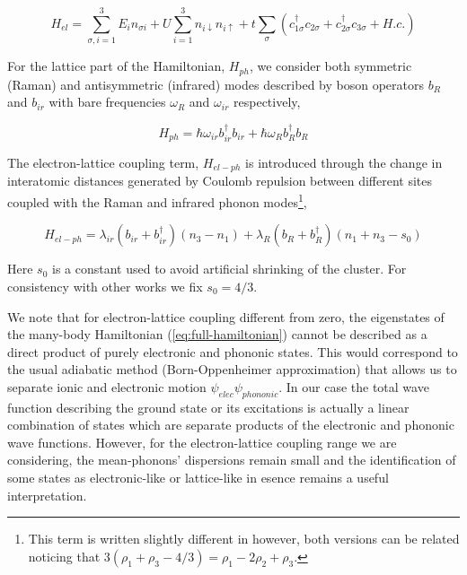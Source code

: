 \begin{equation}\label{eq:electronic-part}
H_{el} = \sum_{\sigma,i=1}^3 E_i n_{\sigma i} + U\sum_{i=1}^3 n_{i\downarrow}n_{i\uparrow} + t\sum_{\sigma}(c_{1\sigma}^\dagger c_{2\sigma} + c_{2\sigma}^\dagger c_{3\sigma} + H.c.)
\end{equation}

For the lattice  part of the Hamiltonian, $H_{ph}$, we consider both symmetric (Raman) and antisymmetric (infrared) modes described by boson operators $b_R$ and $b_{ir}$ with bare frequencies $\omega_R$ and $\omega_{ir}$ respectively,
 
\begin{equation}\label{eq:phonon-part}
H_{ph} = \hbar \omega_{ir}b_{ir}^\dagger b_{ir} + \hbar \omega_R b_R^\dagger b_R
\end{equation}

 
The electron-lattice coupling term, $H_{el-ph}$ is introduced through the change in interatomic distances generated by Coulomb repulsion between different sites coupled with the Raman and infrared phonon modes\footnote{This term is written slightly different in \cite{MustredeLeon1992} however, both versions can be related noticing that $3 (\rho_1+\rho_3-4/3)=\rho_1-2\rho_2+\rho_3$.},
 
\begin{equation}\label{eq:coupling-part}
H_{el-ph} = \lambda_{ir}(b_{ir} + b_{ir}^\dagger)(n_3 - n_1) + \lambda_R (b_R + b_R^\dagger)(n_1 + n_3-s_0)
\end{equation}

Here $s_0$ is a constant used to avoid artificial shrinking of the cluster. For consistency with other works \cite{MustredeLeon1992,DeLeon1999,Leon2008,MirandaMena2007} we fix $s_0=4/3$.


 We note that for electron-lattice coupling different from zero, the eigenstates of the many-body Hamiltonian (\ref{eq:full-hamiltonian}) cannot be described as a direct product of purely electronic and phononic states. 
This would correspond to the usual adiabatic method (Born-Oppenheimer approximation) that allows us to separate ionic and electronic motion $\psi_{elec}\psi_{phononic}$. 
In our case the total wave function describing the ground state or its excitations is actually a linear combination of states which are separate products of the electronic and phononic wave functions. 
However, for the electron-lattice coupling range we are considering, the mean-phonons' dispersions remain small and the identification of some states as electronic-like or lattice-like in esence remains a useful interpretation.

